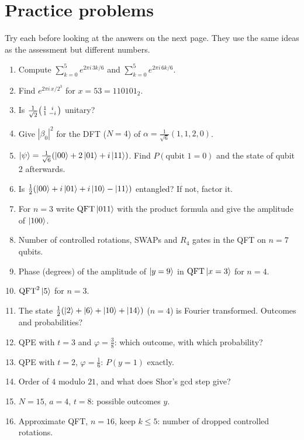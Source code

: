 \documentclass[11pt,a4paper,openany]{book}
\newcommand{\QFT}{\mathrm{QFT}}
\begin{document}
\section{Practice problems}
Try each before looking at the answers on the next page. They use the same ideas as the assessment but different
numbers.
\begin{enumerate}[label=\textbf{P\arabic*.}, leftmargin=2.6em, itemsep=3pt]
\item Compute $\sum_{k=0}^{5} e^{2\pi i\,3k/6}$ and $\sum_{k=0}^{5} e^{2\pi i\,6k/6}$.
\item Find $e^{2\pi i\,x/2^3}$ for $x = 53 = 110101_2$.
\item Is $\frac{1}{\sqrt2}\begin{psmallmatrix}1 & i\\ 1 & -i\end{psmallmatrix}$ unitary?
\item Give $|\beta_0|^2$ for the DFT ($N = 4$) of $\alpha = \frac{1}{\sqrt6}(1, 1, 2, 0)$.
\item $\ket\psi = \frac{1}{\sqrt6}(\ket{00} + 2\ket{01} + i\ket{11})$. Find $P(\text{qubit 1} = 0)$ and the state of qubit 2 afterwards.
\item Is $\frac12(\ket{00} + i\ket{01} + i\ket{10} - \ket{11})$ entangled? If not, factor it.
\item For $n = 3$ write $\QFT\ket{011}$ with the product formula and give the amplitude of $\ket{100}$.
\item Number of controlled rotations, SWAPs and $R_4$ gates in the QFT on $n = 7$ qubits.
\item Phase (degrees) of the amplitude of $\ket{y = 9}$ in $\QFT\ket{x = 3}$ for $n = 4$.
\item $\QFT^2\ket{5}$ for $n = 3$.
\item The state $\frac{1}{2}(\ket2 + \ket6 + \ket{10} + \ket{14})$ ($n = 4$) is Fourier transformed. Outcomes and probabilities?
\item QPE with $t = 3$ and $\varphi = \frac38$: which outcome, with which probability?
\item QPE with $t = 2$, $\varphi = \frac16$: $P(y = 1)$ exactly.
\item Order of $4$ modulo $21$, and what does Shor's gcd step give?
\item $N = 15$, $a = 4$, $t = 8$: possible outcomes $y$.
\item Approximate QFT, $n = 16$, keep $k \le 5$: number of dropped controlled rotations.
\end{enumerate}
\end{document}
